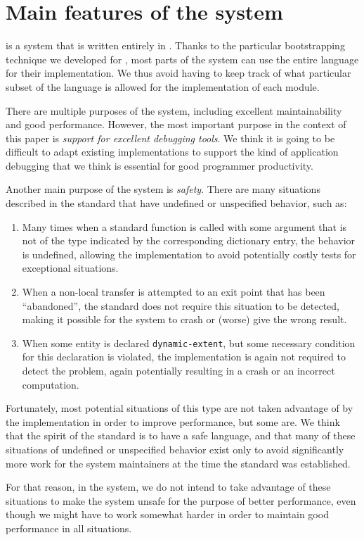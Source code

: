 \section{Main features of the \sicl{} system}
\label{sec-sicl-features}

\sicl{} is a system that is written entirely in \commonlisp{}.  Thanks
to the particular bootstrapping technique
\cite{durand_irene_2019_2634314} we developed for \sicl{}, most parts
of the system can use the entire language for their implementation.
We thus avoid having to keep track of what particular subset of the
language is allowed for the implementation of each module.

There are multiple purposes of the \sicl{} system, including excellent
maintainability and good performance.  However, the most important
purpose in the context of this paper is \emph{support for excellent
  debugging tools}.  We think it is going to be difficult to adapt
existing \commonlisp{} implementations to support the kind of
application debugging that we think is essential for good programmer
productivity.

Another main purpose of the \sicl{} system is \emph{safety}.  There
are many situations described in the \commonlisp{} standard that have
undefined or unspecified behavior, such as:

\begin{enumerate}
\item Many times when a standard function is called with some argument
  that is not of the type indicated by the corresponding dictionary
  entry, the behavior is undefined, allowing the implementation to
  avoid potentially costly tests for exceptional situations.
\item When a non-local transfer is attempted to an exit point that has
  been ``abandoned'', the standard does not require this situation to
  be detected, making it possible for the system to crash or (worse)
  give the wrong result.
\item When some entity is declared \texttt{dynamic-extent}, but some
  necessary condition for this declaration is violated, the
  implementation is again not required to detect the problem, again
  potentially resulting in a crash or an incorrect computation.
\end{enumerate}

Fortunately, most potential situations of this type are not taken
advantage of by the implementation in order to improve performance,
but some are.  We think that the spirit of the \commonlisp{} standard
is to have a safe language, and that many of these situations of
undefined or unspecified behavior exist only to avoid significantly
more work for the system maintainers at the time the standard was
established.

For that reason, in the \sicl{} system, we do not intend to take
advantage of these situations to make the system unsafe for the
purpose of better performance, even though we might have to work
somewhat harder in order to maintain good performance in all
situations.
